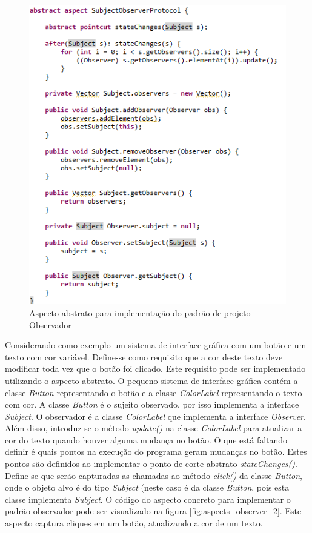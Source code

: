 \begin{figure}
	\centering
	\includegraphics{img/aspects_observer_1.png}
	\caption{Aspecto abstrato para implementação do padrão de projeto Observador}\label{fig:aspects_observer_1}
\end{figure}

Considerando como exemplo um sistema de interface gráfica com um botão e um
texto com cor variável. Define-se como requisito que a cor deste texto deve modificar toda vez
que o botão foi clicado. Este requisito pode ser implementado utilizando o
aspecto abstrato. O pequeno sistema de interface gráfica contém a classe
\textit{Button} representando o botão e a classe \textit{ColorLabel}
representando o texto com cor. A classe \textit{Button} é o sujeito observado,
por isso implementa a interface \textit{Subject}. O observador é a classe
\textit{ColorLabel} que implementa a interface \textit{Observer}. Além disso,
introduz-se o método \textit{update()} na classe \textit{ColorLabel} para
atualizar a cor do texto quando houver alguma mudança no botão. O que está
faltando definir é quais pontos na execução do programa geram mudanças no botão.
Estes pontos são definidos ao implementar o ponto de corte abstrato
\textit{stateChanges()}. Define-se que serão capturadas as chamadas ao método
\textit{click()} da classe \textit{Button}, onde o objeto alvo é do tipo
\textit{Subject} (neste caso é da classe \textit{Button}, pois esta classe
implementa \textit{Subject}. O código do aspecto concreto para implementar o
padrão observador pode ser visualizado na figura \ref{fig:aspects_observer_2}. 
Este aspecto captura cliques em um botão, atualizando a cor de um texto.


